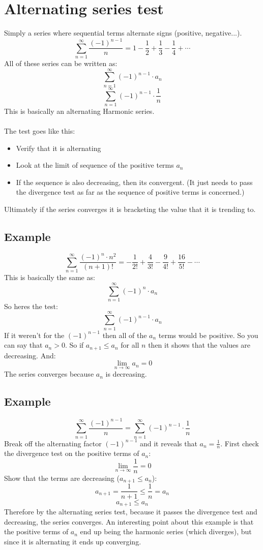 \documentclass{article}
\begin{document}
\section{Alternating series test}
    Simply a series where sequential terms alternate signs (positive, negative...). 
    \[\sum_{n = 1}^{\infty} \frac{(-1)^{n-1}}{n} = 1 - \frac{1}{2} + \frac{1}{3} - \frac{1}{4} + \cdots \]
    All of these series can be written as:
    \[\sum_{n = 1}^{\infty}  (-1)^{n-1} \cdot a_n\]
    \[\sum_{n = 1}^{\infty} (-1)^{n-1} \cdot \frac{1}{n}\]
    This is basically an alternating Harmonic series.\\
    \\
    The test goes like this:
    \begin{itemize}
        \item Verify that it is alternating
        \item Look at the limit of sequence of the positive terms \(a_n\)
        \item If the sequence is also decreasing, then its convergent. (It just needs to pass the divergence test as far as the sequence of positive terms is concerned.)
    \end{itemize}
    Ultimately if the series converges it is bracketing the value that it is trending to.
    \subsection{Example}
        \[\sum_{n = 1}^{\infty}  \frac{(-1)^n \cdot n^2}{(n+1)!} = -\frac{1}{2!} + \frac{4}{3!} - \frac{9}{4!} + \frac{16}{5!} - \cdots \]
        This is basically the same as:
        \[\sum_{n = 1}^{\infty} (-1)^n \cdot a_n \]
        So heres the test:
        \[\sum_{n = 1}^{\infty} (-1)^{n-1} \cdot a_n \]
        If it weren't for the \((-1)^{n-1}\) then all of the \(a_n\) terms would be positive. So you can say that \(a_n > 0\).
        So if \(a_{n+1} \leq a_n\) for all \(n\) then it shows that the values are decreasing. And:
        \[\lim_{n \to \infty} a_n  = 0\]
        The series converges because \(a_n\) is decreasing.
    
    \subsection{Example}
        \[\sum_{n = 1}^{\infty} \frac{(-1)^{n-1}}{n} = \sum_{n = 1}^{\infty} (-1)^{n-1} \cdot \frac{1}{n}\]
        Break off the alternating factor \((-1)^{n-1}\) and it reveals that \(a_n = \frac{1}{n}\). 
        First check the divergence test on the positive terms of \(a_n\):
        \[\lim_{n \to \infty} \frac{1}{n} = 0\]
        Show that the terms are decreasing (\(a_{n+1} \leq a_n\)):
        \[a_{n+1} = \frac{1}{n+1} \leq \frac{1}{n} = a_n\]
        \[a_{n+1} \leq a_n\]
        Therefore by the alternating series test, because it passes the divergence test and decreasing, the series converges.
        An interesting point about this example is that the positive terms of \(a_n\) end up being the harmonic series (which diverges), but since it is alternating it ends up converging.
        
\end{document}
